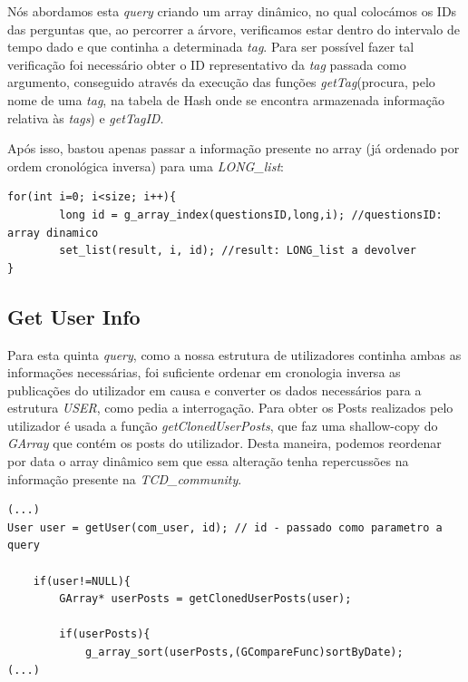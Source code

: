 \documentclass[a4paper, 11pt, oneside]{article}
\begin{document}
Nós abordamos esta \textit{query} criando um array dinâmico, no qual colocámos os IDs das perguntas que, ao percorrer a árvore, verificamos estar dentro do intervalo de tempo dado e que continha a determinada \textit{tag}. Para ser possível fazer tal verificação foi necessário obter o ID representativo da \textit{tag} passada como argumento, conseguido através da execução das funções \textit{getTag}(procura, pelo nome de uma \textit{tag}, na tabela de Hash onde se encontra armazenada informação relativa às \textit{tags}) e \textit{getTagID}.

Após isso, bastou apenas passar a informação presente no array (já ordenado por ordem cronológica inversa) para uma \textit{LONG\_list}:

\begin{lstlisting}[caption=Query 4 - array dinâmico para LONG\_list]
for(int i=0; i<size; i++){
		long id = g_array_index(questionsID,long,i); //questionsID: array dinamico
		set_list(result, i, id); //result: LONG_list a devolver
}
\end{lstlisting}

\subsection{Get User Info}
Para esta quinta \textit{query}, como a nossa estrutura de utilizadores continha ambas as informações necessárias, foi suficiente ordenar em cronologia inversa as publicações do utilizador em causa e converter os dados necessários para a estrutura \textit{USER}, como pedia a interrogação. Para obter os Posts realizados pelo utilizador é usada a função \textit{getClonedUserPosts}, que faz uma shallow-copy do \textit{GArray} que contém os posts do utilizador. Desta maneira, podemos reordenar por data o array dinâmico sem que essa alteração tenha repercussões na informação presente na \textit{TCD\_community}.


\begin{lstlisting}[caption=Query 5 - preservação do encapsulamento]
(...)
User user = getUser(com_user, id); // id - passado como parametro a query
	
	if(user!=NULL){
		GArray* userPosts = getClonedUserPosts(user);
		
		if(userPosts){
			g_array_sort(userPosts,(GCompareFunc)sortByDate);
(...)
\end{lstlisting}
\end{document}
